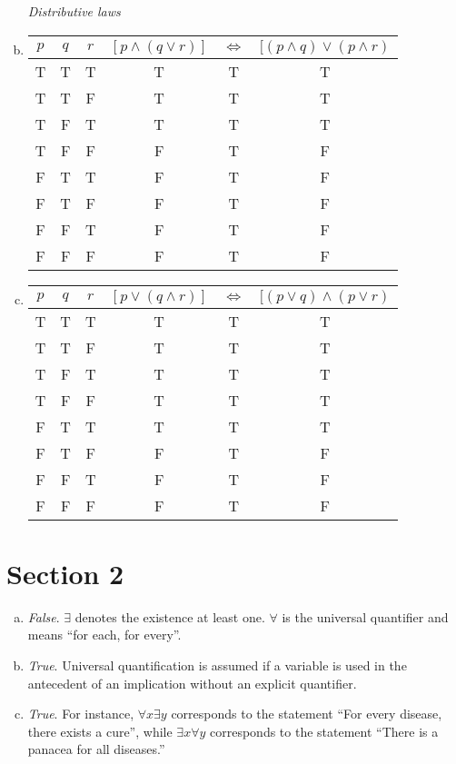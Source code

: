 \documentclass[12pt]{scrartcl} %
\begin{document}
\begin{enumerate}[(a)]
\emph{Distributive laws}
\item \begin{tabular}{*{3}{c}|*{3}{c}}$p$&$q$&$r$&$[p \land (q \lor r)]$&$\iff$&$[(p \land q) \lor (p \land r)$\\
\hline
T&T&T&T&T&T\\
T&T&F&T&T&T\\
T&F&T&T&T&T\\
T&F&F&F&T&F\\
F&T&T&F&T&F\\
F&T&F&F&T&F\\
F&F&T&F&T&F\\
F&F&F&F&T&F\\
\end{tabular}

\item \begin{tabular}{*{3}{c}|*{3}{c}}$p$&$q$&$r$&$[p \lor (q \land r)]$&$\iff$&$[(p \lor q) \land (p \lor r)$\\
\hline
T&T&T&T&T&T\\
T&T&F&T&T&T\\
T&F&T&T&T&T\\
T&F&F&T&T&T\\
F&T&T&T&T&T\\
F&T&F&F&T&F\\
F&F&T&F&T&F\\
F&F&F&F&T&F\\
\end{tabular}
\end{enumerate}

\section{Section 2}

\begin{enumerate}[(a)]
	\item \emph{False}. $\exists$ denotes the existence at least one. $\forall$ is the universal quantifier and means ``for each, for every''.
	\item \emph{True}. Universal quantification is assumed if a variable is used in the antecedent of an implication without an explicit quantifier.
	\item \emph{True}. For instance, $\forall x \exists y$ corresponds to the statement ``For every disease, there exists a cure'', while $\exists x \forall y$ corresponds to the statement ``There is a panacea for all diseases.''	
\end{enumerate}
\end{document}
